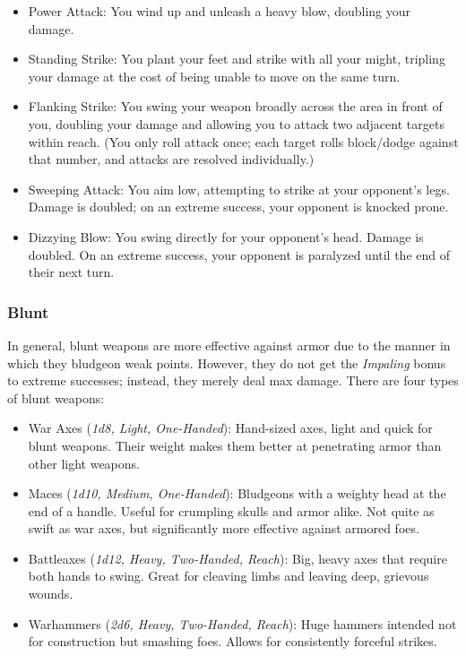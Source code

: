 \begin{itemize}
	\item Power Attack: You wind up and unleash a heavy blow, doubling your damage.
	\item Standing Strike: You plant your feet and strike with all your might, tripling your damage at the cost of being unable to move on the same turn.
	\item Flanking Strike: You swing your weapon broadly across the area in front of you, doubling your damage and allowing you to attack two adjacent targets within reach. (You only roll attack once; each target rolls block/dodge against that number, and attacks are resolved individually.)
	\item Sweeping Attack: You aim low, attempting to strike at your opponent's legs. Damage is doubled; on an extreme success, your opponent is knocked prone.
	\item Dizzying Blow: You swing directly for your opponent's head. Damage is doubled. On an extreme success, your opponent is paralyzed until the end of their next turn.
\end{itemize}

\subsubsection{Blunt}

In general, blunt weapons are more effective against armor due to the manner in which they bludgeon weak points. However, they do not get the \textit{Impaling} bonus to extreme successes; instead, they merely deal max damage. There are four types of blunt weapons:

\begin{itemize}
	\item War Axes (\textit{1d8, Light, One-Handed}): Hand-sized axes, light and quick for blunt weapons. Their weight makes them better at penetrating armor than other light weapons.
	\item Maces (\textit{1d10, Medium, One-Handed}): Bludgeons with a weighty head at the end of a handle. Useful for crumpling skulls and armor alike. Not quite as swift as war axes, but significantly more effective against armored foes.
	\item Battleaxes (\textit{1d12, Heavy, Two-Handed, Reach}): Big, heavy axes that require both hands to swing. Great for cleaving limbs and leaving deep,  grievous wounds.
	\item Warhammers (\textit{2d6, Heavy, Two-Handed, Reach}): Huge hammers intended not for construction but smashing foes. Allows for consistently forceful strikes.
\end{itemize}

